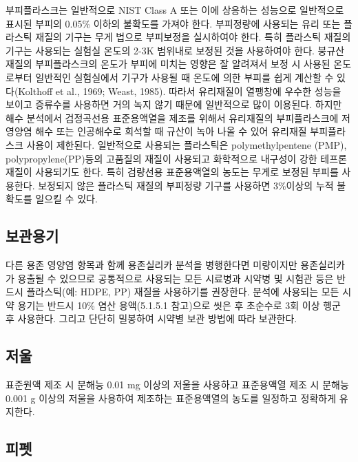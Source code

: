 \documentclass[
]{book}
\begin{document}
부피플라스크는 일반적으로 NIST Class A 또는 이에 상응하는 성능으로 일반적으로 표시된 부피의 0.05\% 이하의 불확도를 가져야 한다. 부피정량에 사용되는 유리 또는 플라스틱 재질의 기구는 무게 법으로 부피보정을 실시하여야 한다. 특히 플라스틱 재질의 기구는 사용되는 실험실 온도의 2-3K 범위내로 보정된 것을 사용하여야 한다. 붕규산 재질의 부피플라스크의 온도가 부피에 미치는 영향은 잘 알려져서 보정 시 사용된 온도로부터 일반적인 실험실에서 기구가 사용될 때 온도에 의한 부피를 쉽게 계산할 수 있다(Kolthoff et al., 1969; Weast, 1985). 따라서 유리재질이 열팽창에 우수한 성능을 보이고 증류수를 사용하면 거의 녹지 않기 때문에 일반적으로 많이 이용된다.
하지만 해수 분석에서 검정곡선용 표준용액열을 제조를 위해서 유리재질의 부피플라스크에 저영양염 해수 또는 인공해수로 희석할 때 규산이 녹아 나올 수 있어 유리재질 부피플라스크 사용이 제한된다. 일반적으로 사용되는 플라스틱은 polymethylpentene (PMP), polypropylene(PP)등의 고품질의 재질이 사용되고 화학적으로 내구성이 강한 테프론 재질이 사용되기도 한다. 특히 검량선용 표준용액열의 농도는 무게로 보정된 부피를 사용한다. 보정되지 않은 플라스틱 재질의 부피정량 기구를 사용하면 3\%이상의 누적 불확도를 일으킬 수 있다.

\hypertarget{uxbcf4uxad00uxc6a9uxae30}{%
\subsection{보관용기}\label{uxbcf4uxad00uxc6a9uxae30}}

다른 용존 영양염 항목과 함께 용존실리카 분석을 병행한다면 미량이지만 용존실리카가 용출될 수 있으므로 공통적으로 사용되는 모든 시료병과 시약병 및 시험관 등은 반드시 플라스틱(예: HDPE, PP) 재질을 사용하기를 권장한다. 분석에 사용되는 모든 시약 용기는 반드시 10\% 염산 용액(5.1.5.1 참고)으로 씻은 후 초순수로 3회 이상 헹군 후 사용한다. 그리고 단단히 밀봉하여 시약별 보관 방법에 따라 보관한다.

\hypertarget{uxc800uxc6b8}{%
\subsection{저울}\label{uxc800uxc6b8}}

표준원액 제조 시 분해능 0.01 mg 이상의 저울을 사용하고 표준용액열 제조 시 분해능 0.001 g 이상의 저울을 사용하여 제조하는 표준용액열의 농도를 일정하고 정확하게 유지한다.

\hypertarget{uxd53cuxd3ab}{%
\subsection{피펫}\label{uxd53cuxd3ab}}
\end{document}
